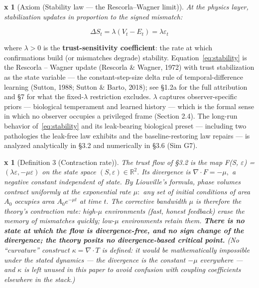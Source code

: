 \documentclass[11pt,twocolumn]{article}
\theoremstyle{gttdef}
\newtheorem*{gttdef}{x}
\theoremstyle{gttplain}
\newtheorem*{gttplain}{x}
\begin{document}
\begin{gttplain}[{Axiom (Stability law — the Rescorla–Wagner limit)}]

At the physics layer, stabilization updates in proportion to the signed mismatch:

\end{gttplain}

\begin{equation}
\Delta S_t = \lambda(V_t - E_t) = \lambda \varepsilon_t
\label{eq:stability}
\end{equation}

where $\lambda > 0$ is the \textbf{trust-sensitivity coefficient}: the rate at which confirmations build (or mismatches degrade) stability. Equation~\eqref{eq:stability} is the Rescorla -- Wagner update (Rescorla \& Wagner, 1972) with trust stabilization as the state variable --- the constant-step-size delta rule of temporal-difference learning (Sutton, 1988; Sutton \& Barto, 2018); see \S{}1.2a for the full attribution and \S{}7 for what the fixed-$\lambda$ restriction excludes. $\lambda$ captures observer-specific priors --- biological temperament and learned history --- which is the formal sense in which no observer occupies a privileged frame (Section 2.4). The long-run behavior of~\eqref{eq:stability} and its leak-bearing biological preset --- including two pathologies the leak-free law exhibits and the baseline-restoring law repairs --- is analyzed analytically in \S{}3.2 and numerically in \S{}3.6 (Sim G7).

\begin{gttdef}[{Definition 3 (Contraction rate)}]

The trust flow of \S{}3.2 is the map F(S, $\varepsilon$) = $(\lambda \varepsilon, -\mu \varepsilon)$ on the state space $(S, \varepsilon) \in \mathbb{R}^{2}.$ Its divergence is $\nabla \cdot F = -\mu,$ a negative constant independent of state. By Liouville's formula, phase volumes contract uniformly at the exponential rate $\mu:$ any set of initial conditions of area $A_{0}$ occupies area $A_{0}e^{-\mu t}$ at time $t.$ The corrective bandwidth $\mu$ is therefore the theory's contraction rate: high-$\mu$ environments (fast, honest feedback) erase the memory of mismatches quickly; low-$\mu$ environments retain them. \textbf{There is no state at which the flow is divergence-free, and no sign change of the divergence; the theory posits no divergence-based critical point.} (No ``curvature'' construct $\kappa = \nabla \cdot T$ is defined: it would be mathematically impossible under the stated dynamics --- the divergence is the constant $-\mu$ everywhere --- and $\kappa$ is left unused in this paper to avoid confusion with coupling coefficients elsewhere in the stack.)

\end{gttdef}
\end{document}
